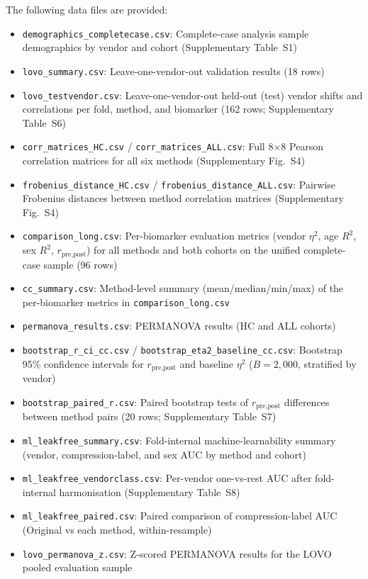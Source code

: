 \documentclass[12pt,a4paper]{article}
\begin{document}
The following data files are provided:
\begin{itemize}[nosep]
  \item \texttt{demographics\_completecase.csv}: Complete-case analysis sample demographics by vendor and cohort (Supplementary Table~S1)
  \item \texttt{lovo\_summary.csv}: Leave-one-vendor-out validation results (18 rows)
  \item \texttt{lovo\_testvendor.csv}: Leave-one-vendor-out held-out (test) vendor shifts and correlations per fold, method, and biomarker (162 rows; Supplementary Table~S6)
  \item \texttt{corr\_matrices\_HC.csv} / \texttt{corr\_matrices\_ALL.csv}: Full 8$\times$8 Pearson correlation matrices for all six methods (Supplementary Fig.~S4)
  \item \texttt{frobenius\_distance\_HC.csv} / \texttt{frobenius\_distance\_ALL.csv}: Pairwise Frobenius distances between method correlation matrices (Supplementary Fig.~S4)
  \item \texttt{comparison\_long.csv}: Per-biomarker evaluation metrics (vendor $\eta^2$, age $R^2$, sex $R^2$, $r_{\text{pre,post}}$) for all methods and both cohorts on the unified complete-case sample (96 rows)
  \item \texttt{cc\_summary.csv}: Method-level summary (mean/median/min/max) of the per-biomarker metrics in \texttt{comparison\_long.csv}
  \item \texttt{permanova\_results.csv}: PERMANOVA results (HC and ALL cohorts)
  \item \texttt{bootstrap\_r\_ci\_cc.csv} / \texttt{bootstrap\_eta2\_baseline\_cc.csv}: Bootstrap 95\% confidence intervals for $r_{\text{pre,post}}$ and baseline $\eta^2$ ($B=2{,}000$, stratified by vendor)
  \item \texttt{bootstrap\_paired\_r.csv}: Paired bootstrap tests of $r_{\text{pre,post}}$ differences between method pairs (20 rows; Supplementary Table~S7)
  \item \texttt{ml\_leakfree\_summary.csv}: Fold-internal machine-learnability summary (vendor, compression-label, and sex AUC by method and cohort)
  \item \texttt{ml\_leakfree\_vendorclass.csv}: Per-vendor one-vs-rest AUC after fold-internal harmonisation (Supplementary Table~S8)
  \item \texttt{ml\_leakfree\_paired.csv}: Paired comparison of compression-label AUC (Original vs each method, within-resample)
  \item \texttt{lovo\_permanova\_z.csv}: Z-scored PERMANOVA results for the LOVO pooled evaluation sample

\end{itemize}
\end{document}
